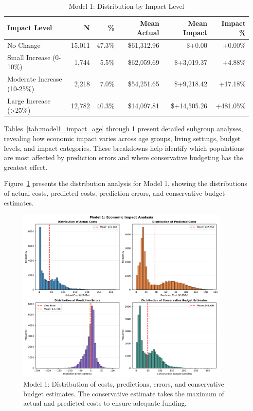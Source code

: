 \begin{table}[htbp]
\centering
\small
\caption{Model 1: Distribution by Impact Level}
\label{tab:model1_impact_distribution}
\begin{tabular}{lrrrrr}
\toprule
\textbf{Impact Level} & \textbf{N} & \textbf{\%} & \textbf{Mean Actual} & \textbf{Mean Impact} & \textbf{Impact \%} \\
\midrule
No Change & 15,011 & 47.3\% & \$61,312.96 & \$+0.00 & +0.00\% \\
Small Increase (0-10\%) & 1,744 & 5.5\% & \$62,059.69 & \$+3,019.37 & +4.88\% \\
Moderate Increase (10-25\%) & 2,218 & 7.0\% & \$54,251.65 & \$+9,218.42 & +17.18\% \\
Large Increase (>25\%) & 12,782 & 40.3\% & \$14,097.81 & \$+14,505.26 & +481.05\% \\
\bottomrule
\end{tabular}
\end{table}

Tables~\ref{tab:model1_impact_age} through \ref{tab:model1_impact_distribution} present detailed subgroup analyses, revealing how economic impact varies across age groups, living settings, budget levels, and impact categories. These breakdowns help identify which populations are most affected by prediction errors and where conservative budgeting has the greatest effect.

Figure~\ref{fig:model1_impact_histograms} presents the distribution analysis for Model 1, showing the distributions of actual costs, predicted costs, prediction errors, and conservative budget estimates.

\begin{figure}[htbp]
\centering
\includegraphics[width=0.95\textwidth]{figures/model_1_Impact_Histograms.pdf}
\caption{Model 1: Distribution of costs, predictions, errors, and conservative budget estimates. The conservative estimate takes the maximum of actual and predicted costs to ensure adequate funding.}
\label{fig:model1_impact_histograms}
\end{figure}

